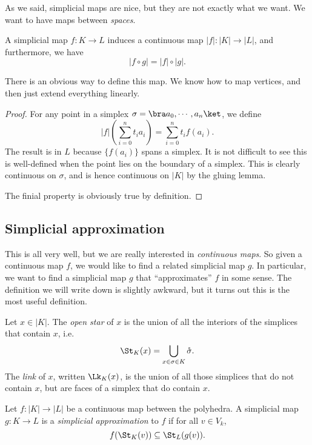 \documentclass[a4paper]{article}
\begin{document}
As we said, simplicial maps are nice, but they are not exactly what we want. We want to have maps between \emph{spaces}.
\begin{lemma}
  A simplicial map $f: K \to L$ induces a continuous map $|f|: |K|\to |L|$, and furthermore, we have
  \[
    |f\circ g| = |f|\circ |g|.
  \]
\end{lemma}
There is an obvious way to define this map. We know how to map vertices, and then just extend everything linearly.
\begin{proof}
  For any point in a simplex $\sigma = \bra a_0,\cdots, a_n\ket$, we define
  \[
    |f|\left(\sum_{i = 0}^n t_i a_i\right) = \sum_{i = 0}^n t_i f(a_i).
  \]
  The result is in $L$ because $\{f(a_i)\}$ spans a simplex. It is not difficult to see this is well-defined when the point lies on the boundary of a simplex. This is clearly continuous on $\sigma$, and is hence continuous on $|K|$ by the gluing lemma.

  The finial property is obviously true by definition.
\end{proof}

\subsection{Simplicial approximation}
This is all very well, but we are really interested in \emph{continuous maps}. So given a continuous map $f$, we would like to find a related simplicial map $g$. In particular, we want to find a simplicial map $g$ that ``approximates'' $f$ in some sense. The definition we will write down is slightly awkward, but it turns out this is the most useful definition.

\begin{defi}
  Let $x \in |K|$. The \emph{open star} of $x$ is the union of all the interiors of the simplices that contain $x$, i.e.
  \[
    \St_K(x) = \bigcup_{x \in \sigma \in K} \mathring{\sigma}.
  \]
  The \emph{link} of $x$, written $\Lk_K(x)$, is the union of all those simplices that do not contain $x$, but are faces of a simplex that do contain $x$.
\end{defi}

\begin{defi}
  Let $f: |K| \to |L|$ be a continuous map between the polyhedra. A simplicial map $g: K \to L$ is a \emph{simplicial approximation} to $f$ if for all $v \in V_k$,
  \[
    f(\St_K(v)) \subseteq \St_L(g(v)).
  \]
\end{defi}
\end{document}
